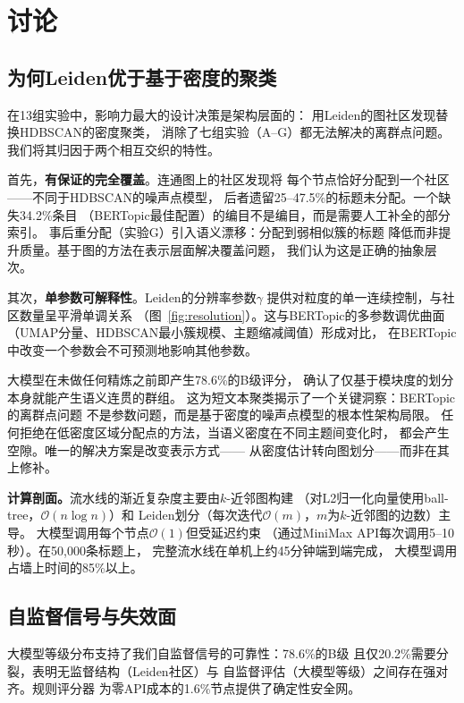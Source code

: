 \documentclass[10pt,twocolumn,twoside]{ctexart}
\begin{document}
\section{讨论}

\subsection{为何Leiden优于基于密度的聚类}

在13组实验中，影响力最大的设计决策是架构层面的：
用Leiden的图社区发现替换HDBSCAN的密度聚类，
消除了七组实验（A--G）都无法解决的离群点问题。
我们将其归因于两个相互交织的特性。

首先，\textbf{有保证的完全覆盖}。连通图上的社区发现将
每个节点恰好分配到一个社区——不同于HDBSCAN的噪声点模型，
后者遗留25--47.5\%的标题未分配。一个缺失34.2\%条目
（BERTopic最佳配置）的编目不是编目，而是需要人工补全的部分索引。
事后重分配（实验G）引入语义漂移：分配到弱相似簇的标题
降低而非提升质量。基于图的方法在表示层面解决覆盖问题，
我们认为这是正确的抽象层次。

其次，\textbf{单参数可解释性}。Leiden的分辨率参数$\gamma$
提供对粒度的单一连续控制，与社区数量呈平滑单调关系
（图~\ref{fig:resolution}）。这与BERTopic的多参数调优曲面
（UMAP分量、HDBSCAN最小簇规模、主题缩减阈值）形成对比，
在BERTopic中改变一个参数会不可预测地影响其他参数。

大模型在未做任何精炼之前即产生78.6\%的B级评分，
确认了仅基于模块度的划分本身就能产生语义连贯的群组。
这为短文本聚类揭示了一个关键洞察：BERTopic的离群点问题
不是参数问题，而是基于密度的噪声点模型的根本性架构局限。
任何拒绝在低密度区域分配点的方法，当语义密度在不同主题间变化时，
都会产生空隙。唯一的解决方案是改变表示方式——
从密度估计转向图划分——而非在其上修补。

\textbf{计算剖面。}流水线的渐近复杂度主要由$k$-近邻图构建
（对L2归一化向量使用ball-tree，$\mathcal{O}(n \log n)$）和
Leiden划分（每次迭代$\mathcal{O}(m)$，$m$为$k$-近邻图的边数）主导。
大模型调用每个节点$\mathcal{O}(1)$但受延迟约束
（通过MiniMax API每次调用5--10秒）。在50,000条标题上，
完整流水线在单机上约45分钟端到端完成，
大模型调用占墙上时间的85\%以上。

\subsection{自监督信号与失效面}

大模型等级分布支持了我们自监督信号的可靠性：78.6\%的B级
且仅20.2\%需要分裂，表明无监督结构（Leiden社区）与
自监督评估（大模型等级）之间存在强对齐。规则评分器
为零API成本的1.6\%节点提供了确定性安全网。
\end{document}
